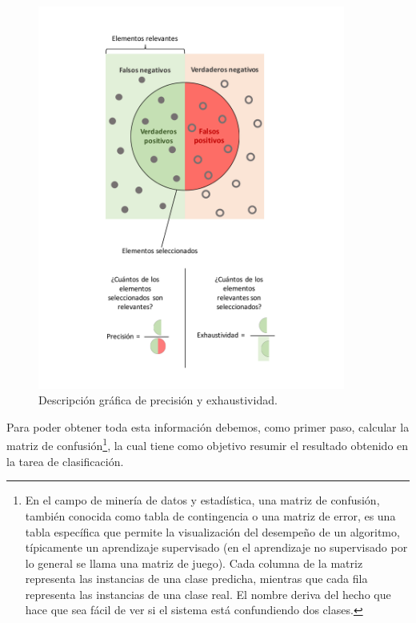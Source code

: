 \begin{figure}[H]
  \centering
    \includegraphics[width=0.9\textwidth]{Figuras/Precision}
      \caption{Descripción gráfica de precisión y exhaustividad.}
    \label{fig:precision}
\end{figure}



Para poder obtener toda esta información debemos, como primer paso, calcular la matriz de confusión\footnote{En el campo de minería de datos y estadística, una matriz de confusión, también conocida como tabla de contingencia o una matriz de error, es una tabla específica que permite la visualización del desempeño de un algoritmo, típicamente un aprendizaje supervisado (en el aprendizaje no supervisado por lo general se llama una matriz de juego). Cada columna de la matriz representa las instancias de una clase predicha, mientras que cada fila representa las instancias de una clase real. El nombre deriva del hecho que hace que sea fácil de ver si el sistema está confundiendo dos clases.}, la cual tiene como objetivo resumir el resultado obtenido en la tarea de clasificación. 

